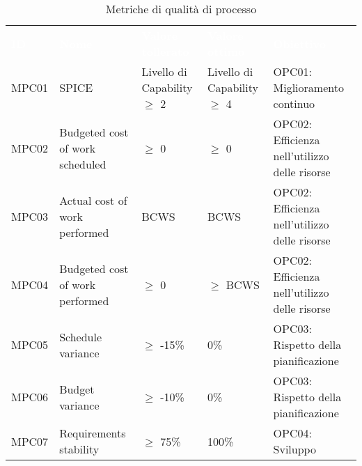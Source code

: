 \begin{table}[H]
    \renewcommand{\arraystretch}{1.5}
    \begin{tabular}{ m{}<{\centering}  m{}<{\centering}  m{}<{\centering}  m{}<{\centering} m{}<{\centering}}
        \rowcolor{darkblue}
        \textcolor{white}{\textbf{ID}} &\textcolor{white}{\textbf{Nome}}& \textcolor{white}{\textbf{Valore tollerato}} & \textcolor{white}{\textbf{Valore ottimo}} & \textcolor{white}{\textbf{Obiettivo}}\\ 
        
        MPC01 &
        SPICE &
        Livello di Capability $\geq$ 2 &
        Livello di Capability $\geq$ 4 &
        OPC01: Miglioramento continuo \\

        MPC02 &
        Budgeted cost of work scheduled &
        $\geq$ 0 &
        $\geq$ 0 &
        OPC02: Efficienza nell’utilizzo delle risorse \\

        MPC03 &
        Actual cost of work performed &
        BCWS &
        BCWS &
        OPC02: Efficienza nell’utilizzo delle risorse\\

        MPC04 &
        Budgeted cost of work performed &
        $\geq$ 0 &
        $\geq$ BCWS &
        OPC02: Efficienza nell’utilizzo delle risorse \\

        MPC05 &
        Schedule variance &
        $\geq$ -15\% &
        0\% &
        OPC03: Rispetto della pianificazione \\

        MPC06 &
        Budget variance &
        $\geq$ -10\% &
        0\% &
        OPC03: Rispetto della pianificazione \\

        MPC07 &
        Requirements stability &
        $\geq$ 75\% &
        100\% &
        OPC04: Sviluppo \\



    \end{tabular}
    \caption{Metriche di qualità di processo}
\end{table}

